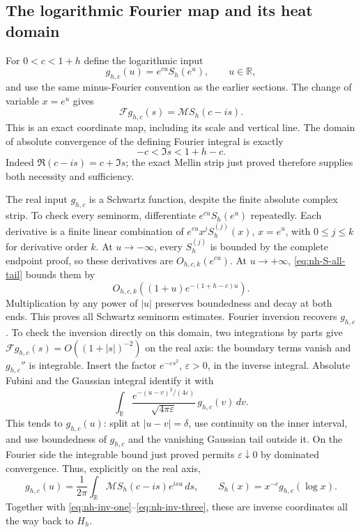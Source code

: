 \subsection{The logarithmic Fourier map and its heat domain}

For \(0<c<1+h\) define the logarithmic input
\begin{equation}\label{eq:nh-log-input}
 g_{h,c}(u)=e^{cu}S_h(e^u),\qquad u\in\mathbb R,
\end{equation}
and use the same minus-Fourier convention as the earlier sections.
The change of variable \(x=e^u\) gives
\begin{equation}\label{eq:nh-fourier}
 \mathscr Fg_{h,c}(s)=\mathcal M S_h(c-is).
\end{equation}
This is an exact coordinate map, including its scale and vertical line.
The domain of absolute convergence of the defining Fourier integral
is exactly
\begin{equation}\label{eq:nh-fourier-strip}
 -c<\Im s<1+h-c .
\end{equation}
Indeed \(\Re(c-is)=c+\Im s\); the exact Mellin strip just proved
therefore supplies both necessity and sufficiency.

The real input \(g_{h,c}\) is a Schwartz function, despite the finite
absolute complex strip. To check every seminorm, differentiate
\(e^{cu}S_h(e^u)\) repeatedly. Each derivative is a finite linear
combination of \(e^{cu}x^jS_h^{(j)}(x)\), \(x=e^u\), with
\(0\le j\le k\) for derivative order \(k\).
At \(u\to-\infty\), every \(S_h^{(j)}\) is bounded by the complete
endpoint proof, so these derivatives are \(O_{h,c,k}(e^{cu})\).
At \(u\to+\infty\), \eqref{eq:nh-S-all-tail} bounds them by
\[
 O_{h,c,k}((1+u)e^{-(1+h-c)u}).
\]
Multiplication by any power of \(|u|\) preserves boundedness and
decay at both ends. This proves all Schwartz seminorm estimates.
Fourier inversion recovers \(g_{h,c}\). To check the inversion directly
on this domain, two integrations by parts give
\(\mathscr Fg_{h,c}(s)=O((1+|s|)^{-2})\) on the real axis:
the boundary terms vanish and \(g_{h,c}''\) is integrable.
Insert the factor \(e^{-\varepsilon s^2}\), \(\varepsilon>0\),
in the inverse integral. Absolute Fubini and the Gaussian integral
identify it with
\[
 \int_{\mathbb R}
 \frac{e^{-(u-v)^2/(4\varepsilon)}}{\sqrt{4\pi\varepsilon}}\,
 g_{h,c}(v)\,dv.
\]
This tends to \(g_{h,c}(u)\): split at \(|u-v|=\delta\), use
continuity on the inner interval, and use boundedness of \(g_{h,c}\)
and the vanishing Gaussian tail outside it. On the Fourier side the
integrable bound just proved permits \(\varepsilon\downarrow0\)
by dominated convergence. Thus, explicitly on the real axis,
\[
 g_{h,c}(u)=\frac1{2\pi}\int_{\mathbb R}
               \mathcal M S_h(c-is)e^{isu}\,ds,\qquad
 S_h(x)=x^{-c}g_{h,c}(\log x).
\]
Together with \eqref{eq:nh-inv-one}--\eqref{eq:nh-inv-three}, these
are inverse coordinates all the way back to \(H_h\).


